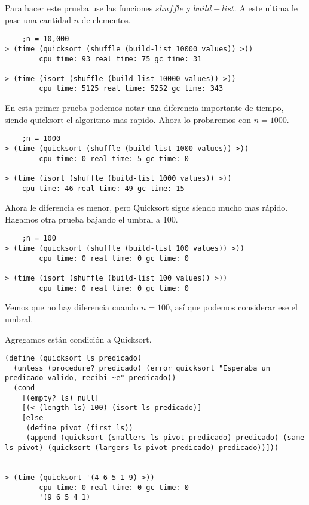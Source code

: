 \documentclass{article}
\begin{document}
Para hacer este prueba use las funciones $shuffle$ y $build-list$. A este ultima le pase una cantidad $n$ de elementos.

\begin{lstlisting}
    ;n = 10,000
> (time (quicksort (shuffle (build-list 10000 values)) >))
		cpu time: 93 real time: 75 gc time: 31

> (time (isort (shuffle (build-list 10000 values)) >))
		cpu time: 5125 real time: 5252 gc time: 343
\end{lstlisting}

En esta primer prueba podemos notar una diferencia importante de tiempo, siendo quicksort el algoritmo mas rapido. Ahora lo probaremos con $n = 1000$.

\begin{lstlisting}
    ;n = 1000
> (time (quicksort (shuffle (build-list 1000 values)) >))
		cpu time: 0 real time: 5 gc time: 0

> (time (isort (shuffle (build-list 1000 values)) >))
	cpu time: 46 real time: 49 gc time: 15
\end{lstlisting}

Ahora le diferencia es menor, pero Quicksort sigue siendo mucho mas rápido. Hagamos otra prueba bajando el umbral a 100.

\begin{lstlisting}
    ;n = 100
> (time (quicksort (shuffle (build-list 100 values)) >))
		cpu time: 0 real time: 0 gc time: 0

> (time (isort (shuffle (build-list 100 values)) >))
		cpu time: 0 real time: 0 gc time: 0
\end{lstlisting}

Vemos que no hay diferencia cuando $n = 100$, así que podemos considerar ese el umbral.

Agregamos están condición a Quicksort.


\begin{lstlisting}
(define (quicksort ls predicado)
  (unless (procedure? predicado) (error quicksort "Esperaba un predicado valido, recibi ~e" predicado))
  (cond
    [(empty? ls) null]
    [(< (length ls) 100) (isort ls predicado)]
    [else
     (define pivot (first ls))
     (append (quicksort (smallers ls pivot predicado) predicado) (same ls pivot) (quicksort (largers ls pivot predicado) predicado))]))


> (time (quicksort '(4 6 5 1 9) >))
		cpu time: 0 real time: 0 gc time: 0
		'(9 6 5 4 1)
\end{lstlisting}
\end{document}
